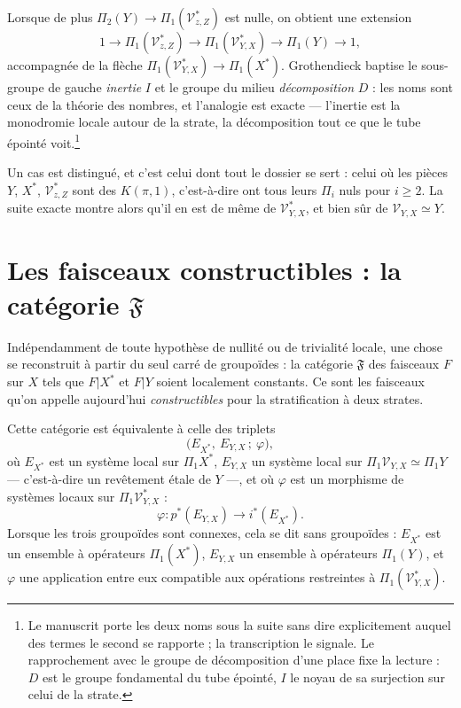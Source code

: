 \documentclass[11pt,a4paper]{article}
\begin{document}
Lorsque de plus $\Pi_{2}(Y) \to \Pi_{1}(\mathcal{V}^{*}_{z,Z})$ est nulle, on
obtient une extension
\[
  1 \longrightarrow \Pi_{1}(\mathcal{V}^{*}_{z,Z}) \longrightarrow
  \Pi_{1}(\mathcal{V}^{*}_{Y,X}) \longrightarrow \Pi_{1}(Y)
  \longrightarrow 1,
\]
accompagnée de la flèche $\Pi_{1}(\mathcal{V}^{*}_{Y,X}) \to \Pi_{1}(X^{*})$.
Grothendieck baptise le sous-groupe de gauche \emph{inertie} $I$ et le groupe du
milieu \emph{décomposition} $D$ : les noms sont ceux de la théorie des nombres,
et l'analogie est exacte — l'inertie est la monodromie locale autour de la
strate, la décomposition tout ce que le tube épointé
voit.\footnote{Le manuscrit porte les deux noms sous la suite sans dire
explicitement auquel des termes le second se rapporte ; la transcription le
signale. Le rapprochement avec le groupe de décomposition d'une place fixe la
lecture : $D$ est le groupe fondamental du tube épointé, $I$ le noyau de sa
surjection sur celui de la strate.}

Un cas est distingué, et c'est celui dont tout le dossier se sert : celui où les
pièces $Y$, $X^{*}$, $\mathcal{V}^{*}_{z,Z}$ sont des $K(\pi,1)$, c'est-à-dire
ont tous leurs $\Pi_{i}$ nuls pour $i \geq 2$. La suite exacte montre alors
qu'il en est de même de $\mathcal{V}^{*}_{Y,X}$, et bien sûr de
$\mathcal{V}_{Y,X} \simeq Y$.

\section*{Les faisceaux constructibles : la catégorie $\mathfrak{F}$}

Indépendamment de toute hypothèse de nullité ou de trivialité locale, une chose
se reconstruit à partir du seul carré de groupoïdes : la catégorie
$\mathfrak{F}$ des faisceaux $F$ sur $X$ tels que $F|X^{*}$ et $F|Y$ soient
localement constants. Ce sont les faisceaux qu'on appelle aujourd'hui
\emph{constructibles} pour la stratification à deux strates.

Cette catégorie est équivalente à celle des triplets
\[
  \bigl(E_{X^{*}},\ E_{Y,X}\,;\ \varphi\bigr),
\]
où $E_{X^{*}}$ est un système local sur $\Pi_{1}X^{*}$, $E_{Y,X}$ un système
local sur $\Pi_{1}\mathcal{V}_{Y,X} \simeq \Pi_{1}Y$ — c'est-à-dire un
revêtement étale de $Y$ —, et où $\varphi$ est un morphisme de systèmes locaux
sur $\Pi_{1}\mathcal{V}^{*}_{Y,X}$ :
\[
  \varphi \colon p^{*}(E_{Y,X}) \longrightarrow i^{*}(E_{X^{*}}).
\]
Lorsque les trois groupoïdes sont connexes, cela se dit sans groupoïdes :
$E_{X^{*}}$ est un ensemble à opérateurs $\Pi_{1}(X^{*})$, $E_{Y,X}$ un
ensemble à opérateurs $\Pi_{1}(Y)$, et $\varphi$ une application entre eux
compatible aux opérations restreintes à $\Pi_{1}(\mathcal{V}^{*}_{Y,X})$.
\end{document}
